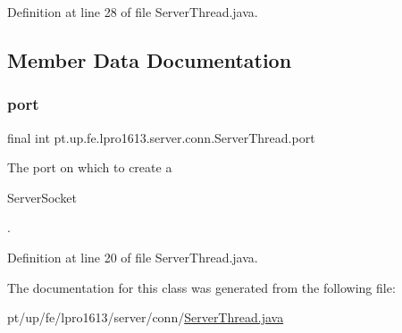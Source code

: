 Definition at line 28 of file Server\+Thread.\+java.



\subsection{Member Data Documentation}
\hypertarget{classpt_1_1up_1_1fe_1_1lpro1613_1_1server_1_1conn_1_1_server_thread_a89129be61d7282900277bab472083325}{}\label{classpt_1_1up_1_1fe_1_1lpro1613_1_1server_1_1conn_1_1_server_thread_a89129be61d7282900277bab472083325} 
\subsubsection{\texorpdfstring{port}{port}}
{\footnotesize\ttfamily final int pt.\+up.\+fe.\+lpro1613.\+server.\+conn.\+Server\+Thread.\+port}

The port on which to create a
\begin{DoxyCode}
ServerSocket 
\end{DoxyCode}
 . 

Definition at line 20 of file Server\+Thread.\+java.



The documentation for this class was generated from the following file\+:\begin{DoxyCompactItemize}
\item 
pt/up/fe/lpro1613/server/conn/\hyperlink{_server_thread_8java}{Server\+Thread.\+java}\end{DoxyCompactItemize}

